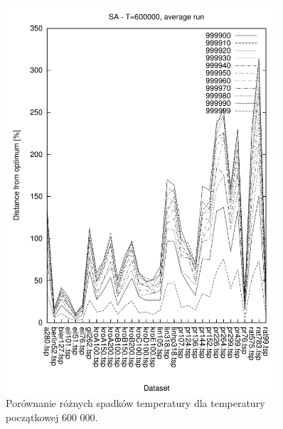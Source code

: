 \begin{figure}
\begin{center}
\includegraphics[width=0.9\textwidth]{wykresy/sa/sa_600000_av}
\end{center}
\caption{Porównanie różnych spadków temperatury dla temperatury początkowej 600 000.}
\label{sa_600000_av}
\end{figure}

